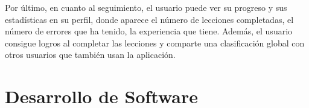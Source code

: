 Por último, en cuanto al seguimiento, el usuario puede ver su progreso y sus estadísticas en su perfil, donde aparece el número de lecciones
completadas, el número de errores que ha tenido, la experiencia que tiene. Además, el usuario consigue logros al completar las lecciones y 
comparte una clasificación global con otros usuarios que también usan la aplicación.


\begin{figure}[H]
    \centering
    \hspace{3em}
\end{figure}

\newpage



\section{Desarrollo de Software}

